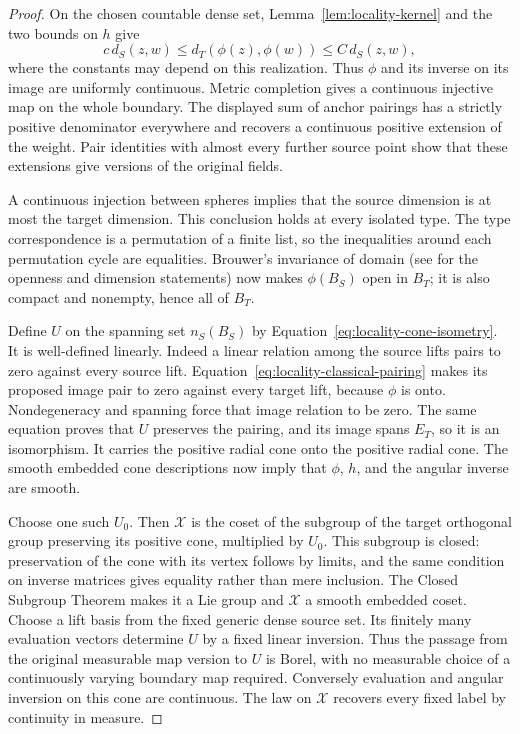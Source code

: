 \begin{proof}
On the chosen countable dense set, Lemma~\ref{lem:locality-kernel} and
the two bounds on $h$ give
\[
 c\,d_S(z,w)\le d_T(\phi(z),\phi(w))\le C\,d_S(z,w),
\]
where the constants may depend on this realization. Thus $\phi$ and
its inverse on its image are uniformly continuous.  Metric completion gives a
continuous injective map on the whole boundary.  The displayed sum of anchor pairings has a strictly positive
denominator everywhere and recovers a continuous positive extension
of the weight.  Pair identities with almost every further source point
show that these extensions give versions of the original fields.

A continuous injection between spheres implies that the source
dimension is at most the target dimension.  This conclusion holds
at every isolated type.  The type correspondence is a permutation
of a finite list, so the inequalities around each permutation
cycle are equalities.  Brouwer's invariance of domain (see
\cite[Theorem~2 and Corollary~3]{Tao2011Invariance} for the openness
and dimension statements) now makes $\phi(B_S)$
open in $B_T$; it is also compact and nonempty, hence all of $B_T$.

Define $U$ on the spanning set $n_S(B_S)$ by
Equation~\eqref{eq:locality-cone-isometry}.  It is well-defined
linearly.  Indeed a linear relation among the source lifts pairs
to zero against every source lift.  Equation~\eqref{eq:locality-classical-pairing}
makes its proposed image pair to zero against every target lift,
because $\phi$ is onto.  Nondegeneracy and spanning force that
image relation to be zero.  The same equation proves that $U$
preserves the pairing, and its image spans $E_T$, so it is an
isomorphism.  It carries the positive radial cone onto the positive
radial cone.  The smooth embedded cone descriptions now imply that
$\phi$, $h$, and the angular inverse are smooth.

Choose one such $U_0$.  Then $\mathcal X$ is the coset of the
subgroup of the target orthogonal group preserving its positive
cone, multiplied by $U_0$.  This subgroup is closed: preservation
of the cone with its vertex follows by limits, and the same
condition on inverse matrices gives equality rather than mere
inclusion.  The Closed Subgroup Theorem makes it a Lie group and
$\mathcal X$ a smooth embedded coset.  Choose a lift basis from the fixed generic dense source set. Its finitely
many evaluation vectors determine $U$ by a fixed linear inversion. Thus
the passage from the original measurable map version to $U$ is Borel,
with no measurable choice of a continuously varying boundary map
required.  Conversely evaluation and
angular inversion on this cone are continuous.  The law on
$\mathcal X$ recovers every fixed label by continuity in measure.
\end{proof}

